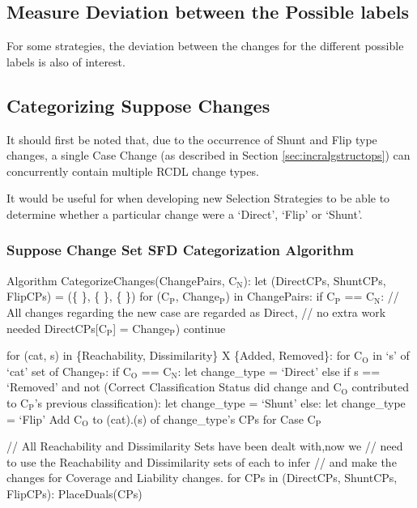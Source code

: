 \documentclass[a4paper,11pt]{report}
\newcommand{\sbt}[1]{\ensuremath{_{\textrm{#1}}}}
\begin{document}
\subsection{Measure Deviation between the Possible labels}
For some strategies, the deviation between the changes for the different possible labels is also of interest.

\subsection{Categorizing Suppose Changes}
It should first be noted that, due to the occurrence of Shunt and Flip type changes, a single Case Change (as described in Section \ref{sec:incralgstructops}) can concurrently contain multiple RCDL change types.

It would be useful for when developing new Selection Strategies to be able to determine whether a particular change were a `Direct', `Flip' or `Shunt'.

\newpage
\subsubsection{Suppose Change Set SFD Categorization Algorithm}
\begin{code}
Algorithm CategorizeChanges(ChangePairs, C\sbt{N}):
  let (DirectCPs, ShuntCPs, FlipCPs) = (\{ \}, \{ \}, \{ \})
  for (C\sbt{P}, Change\sbt{P}) in ChangePairs:
    if C\sbt{P} == C\sbt{N}:
      // All changes regarding the new case are regarded as Direct, 
      // no extra work needed
      DirectCPs[C\sbt{P}] = Change\sbt{P})
      continue
    
    for (cat, s) in \{Reachability, Dissimilarity\} X \{Added, Removed\}:
      for C\sbt{O} in `s' of `cat' set of Change\sbt{P}:
        if C\sbt{O} == C\sbt{N}:
          let change_type = `Direct'
        else if s == `Removed' 
            and not (Correct Classification Status did change
                     and C\sbt{O} contributed to C\sbt{P}'s previous classification):
          let change_type = `Shunt'
        else:
          let change_type = `Flip'
      Add C\sbt{O} to (cat).(s) of change_type's CPs for Case C\sbt{P}
    
  // All Reachability and Dissimilarity Sets have been dealt with,now we
  // need to use the Reachability and Dissimilarity sets of each to infer
  // and make the changes for Coverage and Liability changes.
  for CPs in (DirectCPs, ShuntCPs, FlipCPs):
    PlaceDuals(CPs)
\end{code}
\end{document}
